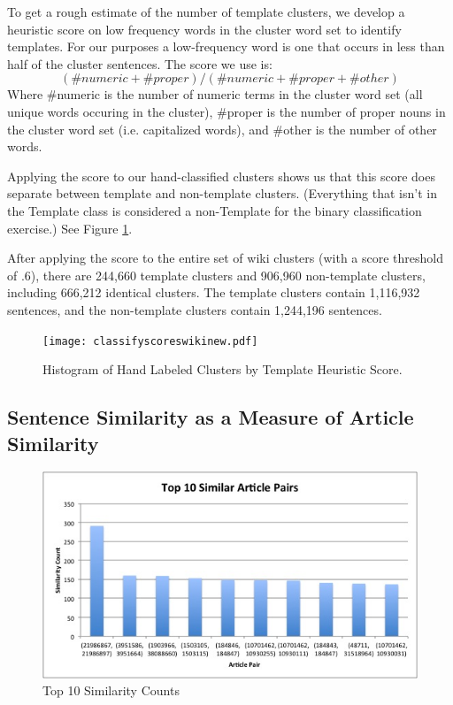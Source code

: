 \documentclass{acm_proc_article-sp}
\begin{document}
To get a rough estimate of the number of template clusters, we develop a heuristic score on low frequency words in the cluster word set to identify templates. For our purposes a low-frequency word is one that occurs in less than half of the cluster sentences. The score we use is:
\[(\#numeric + \#proper)/(\#numeric + \#proper + \#other)\]
Where \#numeric is the number of numeric terms in the cluster word set (all unique words occuring in the cluster), \#proper is the number of proper nouns in the cluster word set (i.e. capitalized words), and \#other is the number of other words.

Applying the score to our hand-classified clusters shows us that this score does separate between template and non-template clusters. (Everything that isn't in the Template class is considered a non-Template for the binary classification exercise.) See Figure \ref{heuristic}.

After applying the score to the entire set of wiki clusters (with a score threshold of .6), there are 244,660 template clusters and 906,960 non-template clusters, including 666,212 identical clusters. The template clusters contain 1,116,932 sentences, and the non-template clusters contain 1,244,196 sentences.

\begin{figure}
\centering
\texttt{[image: classifyscoreswikinew.pdf]}
\caption{Histogram of Hand Labeled Clusters by Template Heuristic Score.}
\label{heuristic}
\end{figure}


\subsection{Sentence Similarity as a Measure of Article Similarity}

\begin{figure}
\begin{center}
\includegraphics[scale=0.43, keepaspectratio = true]{Top10ArticlePairs.jpg}
\end{center}
\caption{Top 10 Similarity Counts}
\label{toparticles}
\end{figure}
\end{document}
